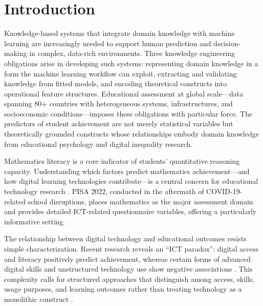 \documentclass[review,12pt]{elsarticle}
\begin{document}

\section{Introduction}

Knowledge-based systems that integrate domain knowledge with machine learning are increasingly needed to support human prediction and decision-making in complex, data-rich environments. Three knowledge engineering obligations arise in developing such systems: representing domain knowledge in a form the machine learning workflow can exploit, extracting and validating knowledge from fitted models, and encoding theoretical constructs into operational feature structures. Educational assessment at global scale---data spanning 80+ countries with heterogeneous systems, infrastructures, and socioeconomic conditions---imposes these obligations with particular force. The predictors of student achievement are not merely statistical variables but theoretically grounded constructs whose relationships embody domain knowledge from educational psychology and digital inequality research.

Mathematics literacy is a core indicator of students' quantitative reasoning capacity. Understanding which factors predict mathematics achievement---and how digital learning technologies contribute---is a central concern for educational technology research \citep{OECD_2022_results_vol1}. PISA 2022, conducted in the aftermath of COVID-19-related school disruptions, places mathematics as the major assessment domain and provides detailed ICT-related questionnaire variables, offering a particularly informative setting \citep{OECD_2022_results_vol2,OECD_2022_database}.

The relationship between digital technology and educational outcomes resists simple characterization. Recent research reveals an ``ICT paradox'': digital access and literacy positively predict achievement, whereas certain forms of advanced digital skills and unstructured technology use show negative associations \citep{Joshi_2025_digital_literacy}. This complexity calls for structured approaches that distinguish among access, skills, usage purposes, and learning outcomes rather than treating technology as a monolithic construct \citep{van_Dijk_2005,van_Dijk_2020}.
\end{document}
